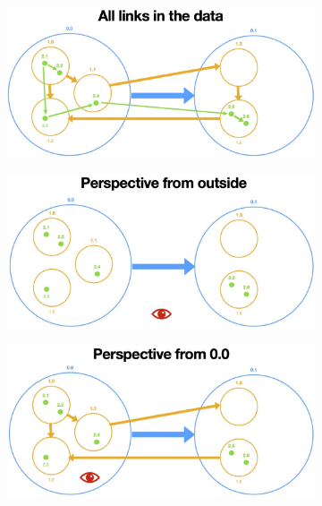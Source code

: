 \begin{figure}[p]
    \centering
    \begin{subfigure}{0.6\columnwidth}
        \centering
        \includegraphics[width=\textwidth]{graphics/filterLinks/allLinks.jpg}
        \label{fig:linkFilter-all}
    \end{subfigure}
    \begin{subfigure}{0.6\columnwidth}
        \centering
        \includegraphics[width=\textwidth]{graphics/filterLinks/outside.jpg}
        \label{fig:linkFilter-outside}
    \end{subfigure}
    \begin{subfigure}{0.6\columnwidth}
        \centering
        \includegraphics[width=\textwidth]{graphics/filterLinks/layer0.jpg}

\end{subfigure}
\end{figure}
